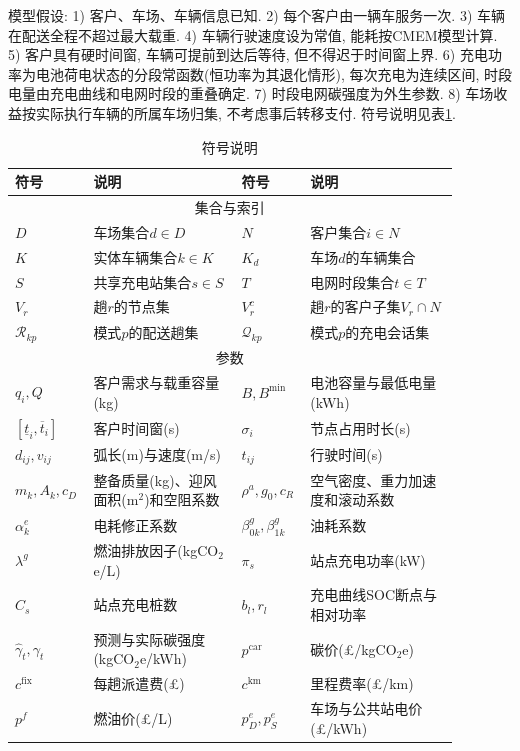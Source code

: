 \documentclass{setp-new}
\newcommand{\setptabsetup}{\fontsize{9pt}{10.5pt}\selectfont\renewcommand{\arraystretch}{0.90}\setlength{\tabcolsep}{2.2pt}\setlength{\aboverulesep}{0.4pt}\setlength{\belowrulesep}{0.4pt}\hbadness=10000}
\begin{document}
模型假设: 1) 客户、车场、车辆信息已知.
2) 每个客户由一辆车服务一次.
3) 车辆在配送全程不超过最大载重.
4) 车辆行驶速度设为常值, 能耗按CMEM模型\cite{ref:27}计算.
5) 客户具有硬时间窗, 车辆可提前到达后等待, 但不得迟于时间窗上界.
6) 充电功率为电池荷电状态的分段常函数(恒功率为其退化情形),
每次充电为连续区间, 时段电量由充电曲线和电网时段的重叠确定.
7) 时段电网碳强度为外生参数.
8) 车场收益按实际执行车辆的所属车场归集, 不考虑事后转移支付.
符号说明见表\ref{tab:symbols}.

\begin{table}[H]
\centering
\caption{符号说明}
\label{tab:symbols}
\setptabsetup
\begin{tabular}{@{}p{0.12\linewidth}p{0.32\linewidth}p{0.12\linewidth}p{0.32\linewidth}@{}}
\toprule
符号 & 说明 & 符号 & 说明\\
\midrule
\multicolumn{4}{c}{集合与索引}\\
$D$ & 车场集合$d\in D$ & $N$ & 客户集合$i\in N$\\
$K$ & 实体车辆集合$k\in K$ & $K_d$ & 车场$d$的车辆集合\\
$S$ & 共享充电站集合$s\in S$ & $T$ & 电网时段集合$t\in T$\\
$V_r$ & 趟$r$的节点集 & $V_r^c$ & 趟$r$的客户子集$V_r\cap N$\\
$\mathcal R_{kp}$ & 模式$p$的配送趟集 & $\mathcal Q_{kp}$ & 模式$p$的充电会话集\\
\multicolumn{4}{c}{参数}\\
$q_i,Q$ & 客户需求与载重容量(kg) & $B,B^{\min}$ & 电池容量与最低电量(kWh)\\
$[\underline t_i,\overline t_i]$ & 客户时间窗(s) & $\sigma_i$ & 节点占用时长(s)\\
$d_{ij},v_{ij}$ & 弧长(m)与速度(m/s) & $t_{ij}$ & 行驶时间(s)\\
$m_k,A_k,c_D$ & 整备质量(kg)、迎风面积(m$^2$)和空阻系数 & $\rho^a,g_0,c_R$ & 空气密度、重力加速度和滚动系数\\
$\alpha_k^e$ & 电耗修正系数 & $\beta_{0k}^g,\beta_{1k}^g$ & 油耗系数\\
$\lambda^g$ & 燃油排放因子(kgCO$_2$e/L) & $\pi_s$ & 站点充电功率(kW)\\
$C_s$ & 站点充电桩数 & $b_l,r_l$ & 充电曲线SOC断点与相对功率\\
$\widehat\gamma_t,\gamma_t$ & 预测与实际碳强度(kgCO$_2$e/kWh) & $p^{\mathrm{car}}$ & 碳价(£/kgCO$_2$e)\\
$c^{\mathrm{fix}}$ & 每趟派遣费(£) & $c^{\mathrm{km}}$ & 里程费率(£/km)\\
$p^f$ & 燃油价(£/L) & $p_D^e,p_S^e$ & 车场与公共站电价(£/kWh)\\

\end{tabular}
\end{table}
\end{document}
